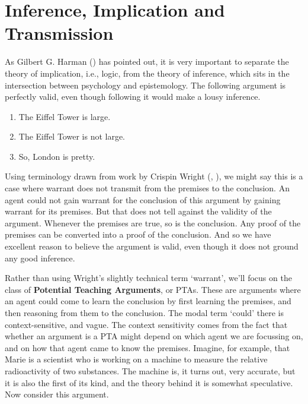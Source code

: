 \documentclass[
  10pt,
  letterpaper,
  twoside]{scrbook}
\providecommand{\tightlist}{%
  \setlength{\itemsep}{0pt}\setlength{\parskip}{0pt}}\usepackage{longtable,booktabs,array}
\begin{document}
\section{Inference, Implication and
Transmission}\label{inferenceimplicationandtransmission}

As Gilbert G. Harman () has pointed out,
it is very important to separate the theory of implication, i.e., logic,
from the theory of inference, which sits in the intersection between
psychology and epistemology. The following argument is perfectly valid,
even though following it would make a lousy inference.

\begin{enumerate}
\def\labelenumi{\arabic{enumi}.}
\tightlist
\item
  The Eiffel Tower is large.
\item
  The Eiffel Tower is not large.
\item
  So, London is pretty.
\end{enumerate}

Using terminology drawn from work by Crispin Wright
(, ), we
might say this is a case where warrant does not transmit from the
premises to the conclusion. An agent could not gain warrant for the
conclusion of this argument by gaining warrant for its premises. But
that does not tell against the validity of the argument. Whenever the
premises are true, so is the conclusion. Any proof of the premises can
be converted into a proof of the conclusion. And so we have excellent
reason to believe the argument is valid, even though it does not ground
any good inference.

Rather than using Wright's slightly technical term `warrant', we'll
focus on the class of \textbf{Potential Teaching Arguments}, or PTAs.
These are arguments where an agent could come to learn the conclusion by
first learning the premises, and then reasoning from them to the
conclusion. The modal term `could' there is context-sensitive, and
vague. The context sensitivity comes from the fact that whether an
argument is a PTA might depend on which agent we are focussing on, and
on how that agent came to know the premises. Imagine, for example, that
{Marie} is a scientist who is working on a machine to measure the
relative radioactivity of two substances. The machine is, it turns out,
very accurate, but it is also the first of its kind, and the theory
behind it is somewhat speculative. Now consider this argument.
\end{document}
